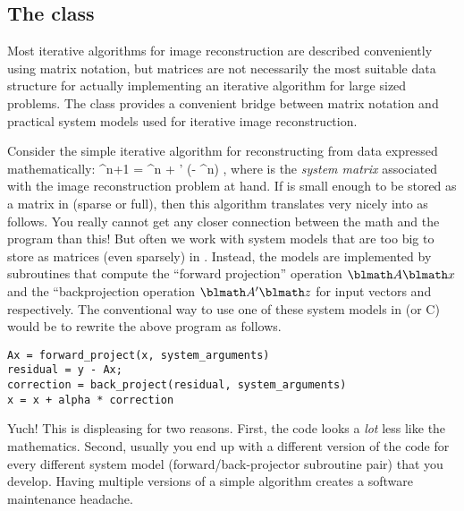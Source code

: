 

\subsection{The \fatrixx class}

Most iterative algorithms
for image reconstruction
are described conveniently using matrix notation,
but matrices are not necessarily
the most suitable data structure
for actually implementing an iterative algorithm
for large sized problems.
The \fatrixx class
provides a convenient bridge
between matrix notation
and practical system models
used for iterative image reconstruction.

Consider the simple iterative algorithm
for reconstructing \x from data \y
expressed mathematically:
\be
\x^{n+1} = \x^n + \alpha \A' (\y - \A\x^n)
,
where \A is the \emph{system matrix}
associated with
the image reconstruction problem at hand.
%
If \A is small enough
to be stored as a matrix in \matlab
(sparse or full),
then this algorithm translates
very nicely into \matlab as follows.
\be
{}
You really cannot get any closer connection
between the math and the program than this!
But often we work
with system models
that are too big to store
as matrices (even sparsely) in \matlab.
Instead,
the models
are implemented by subroutines
that compute the ``forward projection'' operation
$\A \x$
and the ``backprojection operation
$\A' \z$
for input vectors \x and \z respectively.
%
The conventional way
to use one of these system models
in \matlab (or C) would be to rewrite
the above program as follows.
\begin{verbatim}
Ax = forward_project(x, system_arguments)
residual = y - Ax;
correction = back_project(residual, system_arguments)
x = x + alpha * correction
\end{verbatim}
Yuch!
This is displeasing for two reasons.
First,
the code looks a \emph{lot} less like the mathematics.
Second,
usually you end up with a different version of the code
for every different system model
(forward/back-projector subroutine pair)
that you develop.
Having multiple versions
of a simple algorithm
creates a software maintenance headache.

